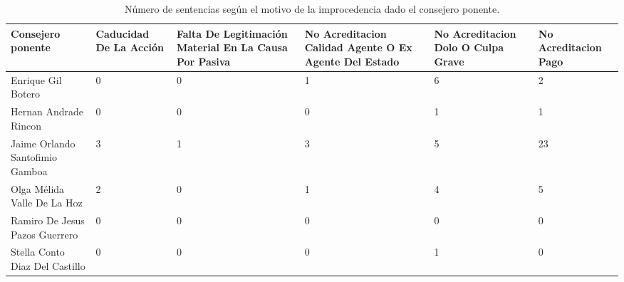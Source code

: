 \begin{sidewaystable}[!htbp]
\centering
\caption{Número de sentencias según el motivo de la improcedencia dado el consejero ponente.} 
\label{tab:consejeroimpro}
\begin{tabular}{lR{2.6cm}R{2.6cm}R{2.6cm}R{2.6cm}R{2.6cm}}
  \hline
Consejero ponente & Caducidad De La Acción & Falta De Legitimación Material En La Causa Por Pasiva & No Acreditacion Calidad Agente O Ex Agente Del Estado & No Acreditacion Dolo O Culpa Grave & No Acreditacion Pago \\ 
  \hline
Enrique Gil Botero &  0 &  0 &  1 &  6 &  2 \\ 
  Hernan Andrade Rincon &  0 &  0 &  0 &  1 &  1 \\ 
  Jaime Orlando Santofimio Gamboa &  3 &  1 &  3 &  5 & 23 \\ 
  Olga Mélida Valle De La Hoz &  2 &  0 &  1 &  4 &  5 \\ 
  Ramiro De Jesus Pazos Guerrero &  0 &  0 &  0 &  0 &  0 \\ 
  Stella Conto Diaz Del Castillo &  0 &  0 &  0 &  1 &  0 \\ 
   \hline
\end{tabular}
\end{sidewaystable}

